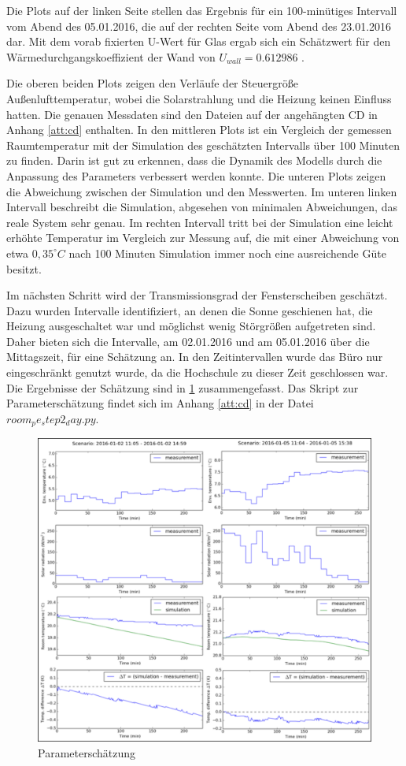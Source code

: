 Die Plots auf der linken Seite stellen das Ergebnis für ein 100-minütiges Intervall vom Abend des 05.01.2016, die auf der rechten Seite vom Abend des 23.01.2016 dar. Mit dem vorab fixierten U-Wert für Glas ergab sich ein Schätzwert für den Wärmedurchgangskoeffizient der Wand von $U_{wall}=0.612986$ .

Die oberen beiden Plots zeigen den Verläufe der Steuergröße Außenlufttemperatur, wobei die Solarstrahlung und die Heizung keinen Einfluss hatten. Die genauen Messdaten sind den Dateien auf der angehängten CD in Anhang \ref{att:cd} enthalten. In den mittleren Plots ist ein Vergleich der gemessen Raumtemperatur mit der Simulation des geschätzten Intervalls über 100 Minuten zu finden. Darin ist gut zu erkennen, dass die Dynamik des Modells durch die Anpassung des Parameters verbessert werden konnte. Die unteren Plots zeigen die Abweichung zwischen der Simulation und den Messwerten. Im unteren linken Intervall beschreibt die Simulation, abgesehen von minimalen Abweichungen, das reale System sehr genau. Im rechten Intervall tritt bei der Simulation eine leicht erhöhte Temperatur im Vergleich zur Messung auf, die mit einer Abweichung von etwa $0,35^{\circ}C$ nach 100 Minuten Simulation immer noch eine ausreichende Güte besitzt.

Im nächsten Schritt wird der Transmissionsgrad der Fensterscheiben geschätzt. Dazu wurden Intervalle identifiziert, an denen die Sonne geschienen hat, die Heizung ausgeschaltet war und möglichst wenig Störgrößen aufgetreten sind. Daher bieten sich die Intervalle, am 02.01.2016 und am 05.01.2016 über die Mittagszeit, für eine Schätzung an. In den Zeitintervallen wurde das Büro nur eingeschränkt genutzt wurde, da die Hochschule zu dieser Zeit geschlossen war. Die Ergebnisse der Schätzung sind in \ref{fig:step2} zusammengefasst. Das Skript zur Parameterschätzung findet sich im Anhang \ref{att:cd} in der Datei $room_pe_step2_day.py$.

\begin{figure}
\centering
\includegraphics[width=\textwidth]{abbildungen/20160329_pestep2}
\caption{Parameterschätzung}
\label{fig:step2}
\end{figure}

